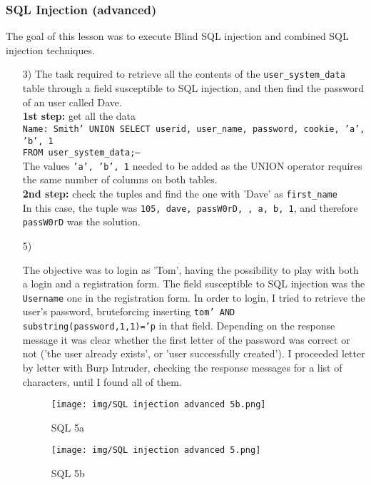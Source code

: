 \documentclass{article}
\begin{document}
\subsubsection{SQL Injection (advanced)}
The goal of this lesson was to execute Blind SQL injection and combined SQL injection techniques.
\begin{itemize}
    \item[3)] {The task required to retrieve all the contents of the \texttt{user\_system\_data} table through a field susceptible to SQL injection, and then find the password of an user called Dave.\\
    \textbf{1st step:} get all the data\\
    \texttt{Name: Smith' UNION SELECT userid, user\_name, password, cookie, 'a', 'b', 1 \\ FROM user\_system\_data;--}\\
    The values \texttt{'a', 'b', 1} needed to be added as the UNION operator requires the same number of columns on both tables.\\
    \textbf{2nd step:} check the tuples and find the one with 'Dave' as \texttt{first\_name}\\
    In this case, the tuple was \texttt{105, dave, passW0rD, , a, b, 1}, and therefore \texttt{passW0rD} was the solution.}
    
    \item[5)] {The objective was to login as 'Tom', having the possibility to play with both a login and a registration form.
    The field susceptible to SQL injection was the \texttt{Username} one in the registration form.
    In order to login, I tried to retrieve the user's password, bruteforcing inserting \texttt{tom' AND substring(password,1,1)='p} in that field.
    Depending on the response message it was clear whether the first letter of the password was correct or not ('the user already exists', or 'user successfully created').
    I proceeded letter by letter with Burp Intruder, checking the response messages for a list of characters, until I found all of them.
    \begin{figure}[H]
        \centering
        \texttt{[image: img/SQL injection advanced 5b.png]}
        \caption{SQL 5a}
        \label{fig:SQL 5}
    \end{figure}
    \begin{figure}[H]
        \centering
        \texttt{[image: img/SQL injection advanced 5.png]}
        \caption{SQL 5b}
        \label{fig:SQL 5}
    \end{figure}
    }
    

\end{itemize}
\end{document}
